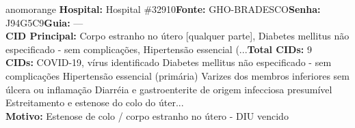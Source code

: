 \documentclass[a4paper,10pt]{article}
\begin{document}
\begin{anomalycard}[Interna\c{c}\~{a}o \#118912 | Pac. \#98629 | ALTO (z=3.85) | LOS: 2d | 25/02/2026\,$\to$\,27/02/2026]{anomorange}
\textbf{Hospital:} Hospital \#32910\quad \textbf{Fonte:} GHO-BRADESCO\quad \textbf{Senha:} J94G5C9\quad \textbf{Guia:} ---\\

\textbf{CID Principal:} {\small Corpo estranho no útero [qualquer parte], Diabetes mellitus não especificado - sem complicações, Hipertensão essencial (...}\quad\textbf{Total CIDs:} 9\\

\textbf{CIDs:} {\scriptsize COVID-19, vírus identificado \textbar{} Diabetes mellitus não especificado - sem complicações \textbar{} Hipertensão essencial (primária) \textbar{} Varizes dos membros inferiores sem úlcera ou inflamação \textbar{} Diarréia e gastroenterite de origem infecciosa presumível \textbar{} Estreitamento e estenose do colo do úter...}\\

\textbf{Motivo:} {\scriptsize Estenose de colo / corpo estranho no útero - DIU vencido}\\




\end{anomalycard}
\end{document}
